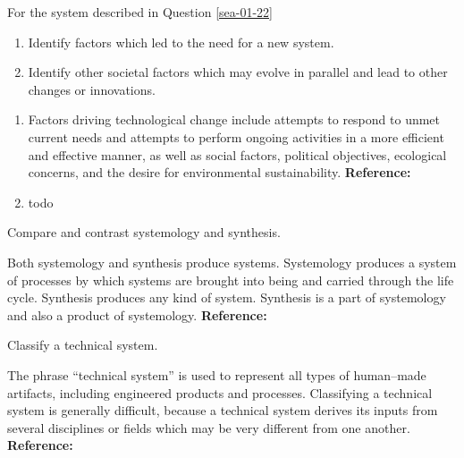 \begin{exercises}
    \begin{exercise} 
    \label{sea-01-25}
        For the system described in Question \ref{sea-01-22}
        \begin{enumerate}[label=\alph*)]
            \item Identify factors which led to the need for a new system.
            \item Identify other societal factors which may evolve in parallel and lead to other changes or innovations.
        \end{enumerate}
    \end{exercise}
    \begin{solution}
        \begin{enumerate}[label=\alph*)]
            \item Factors driving technological change include attempts to respond to unmet current needs and attempts to perform ongoing activities in a more efficient and effective manner, as well as social factors, political objectives, ecological concerns, and the desire for environmental sustainability. \textbf{Reference:}
            \item todo
        \end{enumerate}
    \end{solution}
    
    \begin{exercise} 
    \label{sea-01-23}
        Compare and contrast systemology and synthesis.
    \end{exercise}
    \begin{solution}
        Both systemology and synthesis produce systems. Systemology produces a system of processes by which systems are brought into being and carried through the life cycle. Synthesis produces any kind of system. Synthesis is a part of systemology and also a product of systemology. \textbf{Reference:}
    \end{solution}
    
    \begin{exercise} 
    \label{sea-01-24}
        Classify a technical system.
    \end{exercise}
    \begin{solution}
        The phrase “technical system” is used to represent all types of human–made artifacts, including engineered products and processes. Classifying a technical system is generally difficult, because a technical system derives its inputs from several disciplines or fields which may be very different from one another. \textbf{Reference:}
    \end{solution}
    

\end{exercises}

